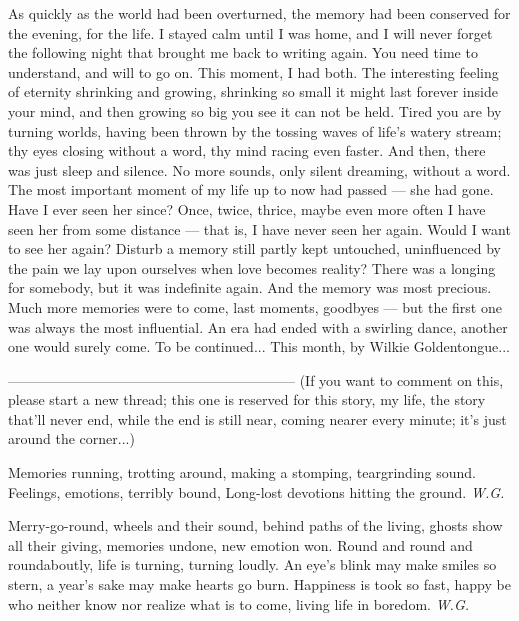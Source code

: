 As quickly as the world had been overturned, the memory had been conserved for the evening, for the life. I stayed calm until I was home, and I will never forget the following night that brought me back to writing again. You need time to understand, and will to go on. This moment, I had both. 
The interesting feeling of eternity shrinking and growing, shrinking so small it might last forever inside your mind, and then growing so big you see it can not be held. 
Tired you are by turning worlds, having been thrown by the tossing waves of life's watery stream; thy eyes closing without a word, thy mind racing even faster. 
And then, there was just sleep and silence. No more sounds, only silent dreaming, without a word. The most important moment of my life up to now had passed --- she had gone. Have I ever seen her since? 
Once, twice, thrice, maybe even more often I have seen her from some distance --- that is, I have never seen her again. 
Would I want to see her again? Disturb a memory still partly kept untouched, uninfluenced by the pain we lay upon ourselves when love becomes reality? There was a longing for somebody, but it was indefinite again. And the memory was most precious. 
Much more memories were to come, last moments, goodbyes --- but the first one was always the most influential. 
An era had ended with a swirling dance, another one would surely come. 
To be continued...
This month, by Wilkie Goldentongue...

--------------------------------------------------------------
(If you want to comment on this, please start a new thread; this one is reserved for this story, my life, the story that'll never end, while the end is still near, coming nearer every minute; it's just around the corner...)

Memories running, 
trotting around, 
making a stomping, 
teargrinding sound. 
Feelings, emotions, 
terribly bound, 
Long-lost devotions 
hitting the ground. 
\emph{W.G.}

Merry-go-round, 
wheels and their sound, 
behind paths of the living, 
ghosts show all their giving, 
memories undone, 
new emotion won. 
Round and round and roundaboutly, 
life is turning, turning loudly. 
An eye's blink may make smiles so stern, 
a year's sake may make hearts go burn. 
Happiness is took so fast, 
happy be who neither know
nor realize what is to come, 
living life in boredom. 
\emph{W.G.}

